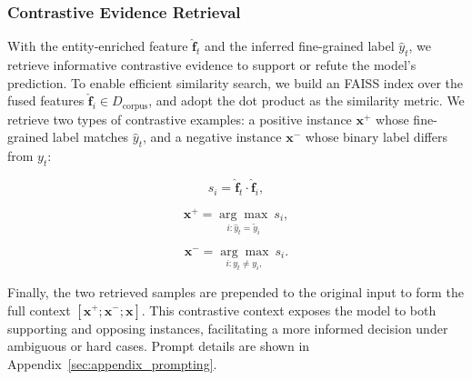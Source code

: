 \subsubsection{Contrastive Evidence Retrieval}
With the entity-enriched feature $\hat{\mathbf{f}}_t$ and the inferred fine-grained label $\hat{y}_t$, we retrieve informative contrastive evidence to support or refute the model's prediction. 
To enable efficient similarity search, we build an FAISS index over the fused features ${\hat{\mathbf{f}}_i} \in D_{\text{corpus}}$, and adopt the dot product as the similarity metric. We retrieve two types of contrastive examples: a positive instance $\mathbf{x}^{+}$ whose fine-grained label matches $\hat{y}_t$, and a negative instance $\mathbf{x}^{-}$ whose binary label differs from $y_t$:

\begin{equation} s_i = \hat{\mathbf{f}}_t \cdot \hat{\mathbf{f}}_i, \end{equation}

\begin{equation} \mathbf{x}^{+} = \underset{i: \hat{{y}}_t = \tilde{{y}}_i}{\arg\max} \: s_i, \end{equation}

\begin{equation} \mathbf{x}^{-} = \underset{i: {y}_t \neq {y}_i, }{\arg\max} \: s_i.\end{equation}

Finally, the two retrieved samples are prepended to the original input to form the full context $[\mathbf{x}^{+};\mathbf{x}^{-};\mathbf{x}]$. This contrastive context exposes the model to both supporting and opposing instances, facilitating a more informed decision under ambiguous or hard cases. Prompt details are shown in Appendix~\ref{sec:appendix_prompting}.

